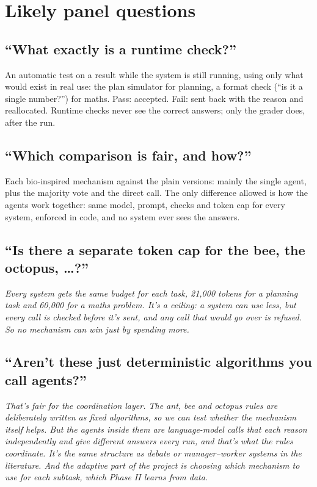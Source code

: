 \documentclass[11pt,a4paper]{article}
\newcommand{\say}[1]{\par\smallskip\noindent\colorbox{accent!10}{\parbox{\dimexpr\linewidth-2\fboxsep}{\small\itshape #1}}\par}
\begin{document}
\section{Likely panel questions}

\subsection*{``What exactly is a runtime check?''}
An automatic test on a result while the system is still running, using only what would exist in real use:
the plan simulator for planning, a format check (``is it a single number?'') for maths. Pass: accepted.
Fail: sent back with the reason and reallocated. Runtime checks never see the correct answers; only the
grader does, after the run.

\subsection*{``Which comparison is fair, and how?''}
Each bio-inspired mechanism against the plain versions: mainly the single agent, plus the majority vote and
the direct call. The only difference allowed is how the agents work together: same model, prompt, checks
and token cap for every system, enforced in code, and no system ever sees the answers.

\subsection*{``Is there a separate token cap for the bee, the octopus, \ldots?''}
\say{Every system gets the same budget for each task, 21,000 tokens for a planning task and 60,000 for a
maths problem. It's a ceiling: a system can use less, but every call is checked before it's sent, and any
call that would go over is refused. So no mechanism can win just by spending more.}

\subsection*{``Aren't these just deterministic algorithms you call agents?''}
\say{That's fair for the coordination layer. The ant, bee and octopus rules are deliberately written as fixed
algorithms, so we can test whether the mechanism itself helps. But the agents inside them are language-model
calls that each reason independently and give different answers every run, and that's what the rules
coordinate. It's the same structure as debate or manager--worker systems in the literature. And the
adaptive part of the project is choosing which mechanism to use for each subtask, which Phase II learns from data.}
\end{document}
